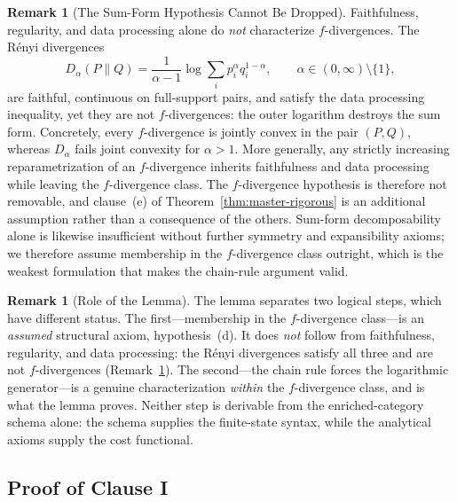 \documentclass[12pt]{article}
\theoremstyle{definition}
\newtheorem{remark}[theorem]{Remark}
\begin{document}
\begin{remark}[The Sum-Form Hypothesis Cannot Be Dropped]
\label{rem:csiszar-sumform-needed}
Faithfulness, regularity, and data processing alone do \emph{not}
characterize $f$-divergences.  The R\'enyi divergences
\[
D_\alpha(P\|Q)
=
\frac1{\alpha-1}
\log\sum_i p_i^\alpha q_i^{1-\alpha},
\qquad
\alpha\in(0,\infty)\setminus\{1\},
\]
are faithful, continuous on full-support pairs, and satisfy the data
processing inequality, yet they are not $f$-divergences: the outer logarithm
destroys the sum form.  Concretely, every $f$-divergence is jointly convex in
the pair $(P,Q)$, whereas $D_\alpha$ fails joint convexity for $\alpha>1$.
More generally, any strictly increasing reparametrization of an
$f$-divergence inherits faithfulness and data processing while leaving the
$f$-divergence class.  The $f$-divergence hypothesis is therefore not removable, and clause~(e) of
Theorem~\ref{thm:master-rigorous} is an additional assumption rather
than a consequence of the others.  Sum-form decomposability alone is likewise
insufficient without further symmetry and expansibility axioms; we therefore
assume membership in the $f$-divergence class outright, which is the weakest
formulation that makes the chain-rule argument valid.
\end{remark}

\begin{remark}[Role of the Lemma]
\label{rem:csiszar-role}
The lemma separates two logical steps, which have different status.  The
first---membership in the $f$-divergence class---is an \emph{assumed}
structural axiom, hypothesis~(d).  It does \emph{not} follow from faithfulness,
regularity, and data processing: the R\'enyi divergences satisfy all three and
are not $f$-divergences (Remark~\ref{rem:csiszar-sumform-needed}).  The
second---the chain rule forces the logarithmic generator---is a genuine
characterization \emph{within} the $f$-divergence class, and is what the lemma
proves.  Neither step is derivable from the enriched-category schema alone: the
schema supplies the finite-state syntax, while the analytical axioms supply the
cost functional.
\end{remark}

\subsection{Proof of Clause I}
\label{subsec:proof-clause-I}
\end{document}
